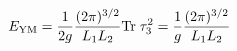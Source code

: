 \begin{equation}
E_{{\rm YM}} = \frac{1}{2g}  \frac{(2 \pi)^{3/2}}{L_1 L_2}  {\rm Tr}\;
\tau_3^2 = \frac{1}{g}  \frac{(2 \pi)^{3/2}}{L_1 L_2} 
\label{eq:unstable-energy}
\end{equation}

